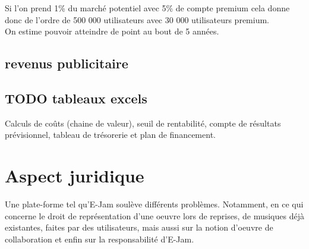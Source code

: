 \documentclass[a4,12pt]{article}
\begin{document}
Si l'on prend 1\% du marché potentiel avec 5\% de compte premium cela donne donc de l'ordre de 500 000 utilisateurs avec 30 000 utilisateurs premium.\\
On estime pouvoir atteindre de point au bout de 5 années.\\

\subsection{revenus publicitaire}

\subsection{TODO tableaux excels}

Calculs de coûts (chaine de valeur), seuil de rentabilité, compte de résultats prévisionnel, tableau de trésorerie et plan de financement.\\

\section{Aspect juridique}
Une plate-forme tel qu'E-Jam soulève différents problèmes. Notamment, en ce qui concerne le droit de représentation d'une oeuvre lors de reprises, de musiques déjà existantes, faites par des utilisateurs, mais aussi sur la notion d'oeuvre de collaboration et enfin sur la responsabilité d'E-Jam.
\end{document}
